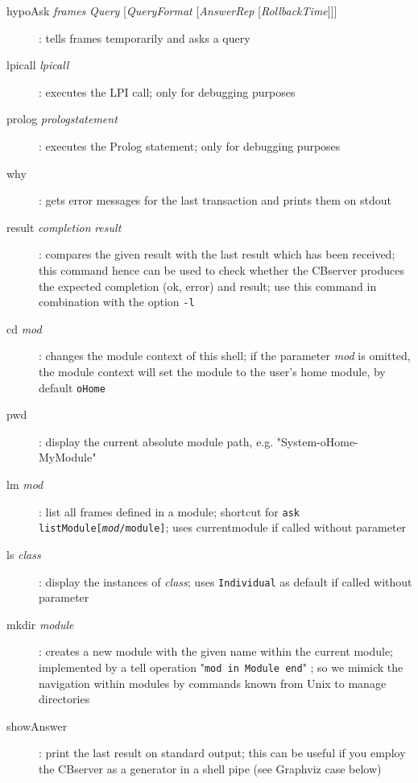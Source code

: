 \begin{description}
\item[hypoAsk {\it frames} {\it Query}  {[{\it QueryFormat} [{\it AnswerRep} [{\it RollbackTime}]]]}] :
      tells frames temporarily and asks a query

\item[lpicall {\it lpicall}] :
      executes the LPI call; only for debugging purposes

\item[prolog {\it prologstatement}] :
      executes the Prolog statement; only for debugging purposes

\item[why] :
      gets error messages for the last transaction and prints them on stdout
      
\item[result {\it completion} {\it result}] :
      compares the given result with the last result which has been received;
      this command hence can be used to check whether the CBserver produces
      the expected completion (ok, error) and result; use this command
      in combination with the option {\tt -l}

\item[cd {\it mod}] :
      changes the module context of this shell; if the parameter {\it mod} is omitted, 
      the module context will set the module to the user's home module, by default {\tt oHome}

\item[pwd] :
      display the current absolute module path, e.g. "System-oHome-MyModule"

\item[lm {\it mod}] :
      list all frames defined in a module;
      shortcut for {\tt ask listModule[{\it mod}/module]};
      uses currentmodule if called without parameter

\item[ls {\it class}] :
      display the instances of {\it class};
      uses {\tt Individual} as default if called without parameter

\item[mkdir {\it module}] :
      creates a new module with the given name within the current module; implemented by
      a tell operation "{\tt mod in Module end}" ; so we mimick the navigation within modules by commands known from Unix
      to manage directories

\item[showAnswer] :
      print the last result on standard output; this can be useful if you
      employ the CBserver as a generator in a shell pipe 
      (see Graphviz case below)


\end{description}
